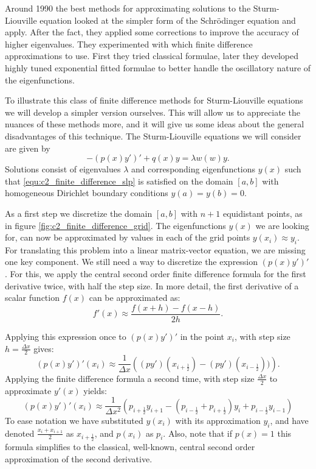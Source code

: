 Around 1990 the best methods \cite{andrew_correction_1985,vandenberghe_accurate_1991} for approximating solutions to the Sturm-Liouville equation looked at the simpler form of the Schrödinger equation and apply. After the fact, they applied some corrections to improve the accuracy of higher eigenvalues. They experimented with which finite difference approximations to use. First they tried classical formulae,  later they developed highly tuned exponential fitted formulae to better handle the oscillatory nature of the eigenfunctions.

To illustrate this class of finite difference methods for Sturm-Liouville equations we will develop a simpler version ourselves. This will allow us to appreciate the nuances of these methods more, and it will give us some ideas about the general disadvantages of this technique. The Sturm-Liouville equations we will consider are given by
\begin{equation}\label{equ:c2_finite_difference_slp}
    -(p(x)y')' + q(x) y = \lambda w(w) y\text{.}
\end{equation}
Solutions consist of eigenvalues $\lambda$ and corresponding eigenfunctions $y(x)$ such that \eqref{equ:c2_finite_difference_slp} is satisfied on the domain $[a, b]$ with homogeneous Dirichlet boundary conditions $y(a) = y(b) = 0$.

As a first step we discretize the domain $[a, b]$ with $n+1$ equidistant points, as in figure \ref{fig:c2_finite_difference_grid}. The eigenfunctions $y(x)$ we are looking for, can now be approximated by values in each of the grid points $y(x_i) \approx y_i$. For translating this problem into a linear matrix-vector equation, we are missing one key component. We still need a way to discretize the expression $(p(x) y')'$. For this, we apply the central second order finite difference formula for the first derivative twice, with half the step size. In more detail, the first derivative of a scalar function $f(x)$ can be approximated as:
$$
    f'(x) \approx \frac{f(x + h) - f(x - h)}{2h}\text{.}
$$

Applying this expression once to $(p(x) y')'$ in the point $x_i$, with step size $h = \frac{\Delta x}{2}$ gives:
$$
    (p(x) y')'(x_i) \approx \frac{1}{\Delta x}\left((p y')\left(x_{i+\frac{1}{2}}\right) - (p y')\left(x_{i-\frac{1}{2}}\right))\right)\text{.}
$$
Applying the finite difference formula a second time, with step size $\frac{\Delta x}{2}$ to approximate $y'(x)$ yields:
$$
    (p(x) y')'(x_i) \approx \frac{1}{\Delta x^2}\left(p_{i+\frac{1}{2}} y_{i+1} - \left(p_{i-\frac{1}{2}} + p_{i+\frac{1}{2}}\right) y_i + p_{i-\frac{1}{2}} y_{i-1}\right)
$$
To ease notation we have substituted $y(x_i)$ with its approximation $y_i$, and have denoted $\frac{x_i + x_{i+1}}{2}$ as $x_{i+\frac{1}{2}}$, and $p(x_i)$ as $p_i$. Also, note that if $p(x) = 1$ this formula simplifies to the classical, well-known, central second order approximation of the second derivative.

